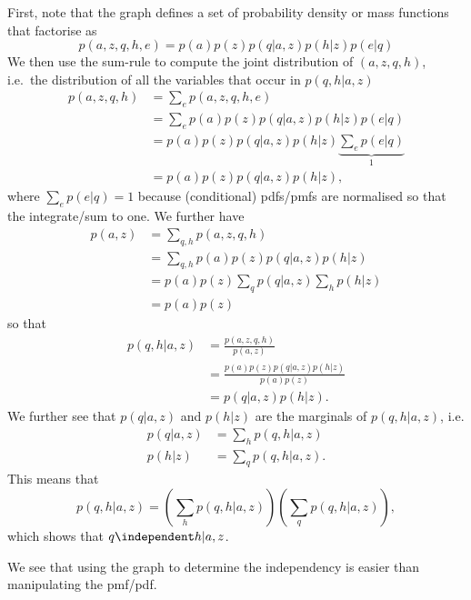 \begin{exenumerate}
\begin{solution}
      First, note that the graph defines a set of probability density
      or mass functions that factorise as
      $$ p(a,z,q,h,e) = p(a) p(z) p(q|a,z) p(h|z) p(e|q)$$ We then use the sum-rule to
      compute the joint distribution of $(a,z,q,h)$, i.e.\ the
      distribution of all the variables that occur in $p(q,h|a,z)$ 
        \begin{align}
          p(a,z,q,h) &= \sum_{e} p(a,z,q,h,e)\\
          &= \sum_{e}  p(a) p(z) p(q|a,z) p(h|z) p(e|q)\\
          & =  p(a) p(z) p(q|a,z) p(h|z) \underbrace{\sum_{e}  p(e|q)}_{1}\\
          & =  p(a) p(z) p(q|a,z) p(h|z),
        \end{align}
        where $\sum_{e}  p(e|q) = 1$ because (conditional) pdfs/pmfs are normalised so that the integrate/sum to one. We further have
        \begin{align}
          p(a,z) & = \sum_{q,h} p(a,z,q,h)\\
          & = \sum_{q,h} p(a) p(z) p(q|a,z) p(h|z)\\
          & = p(a) p(z) \sum_{q}  p(q|a,z) \sum_h p(h|z)\\
          & = p(a) p(z)
        \end{align}
        so that
        \begin{align}
          p(q,h | a,z) & = \frac{ p(a,z,q,h)}{ p(a,z)} \\
          & = \frac{ p(a) p(z) p(q|a,z) p(h|z)}{ p(a) p(z)}\\
          & =  p(q|a,z) p(h|z).
        \end{align}        
        We further see that $p(q| a,z)$ and $p(h|z)$ are the marginals of $p(q,h|a,z)$, i.e.
        \begin{align}
          p(q| a,z) & = \sum_h  p(q,h | a,z)\\
          p(h|z) & = \sum_q  p(q,h | a,z).
        \end{align}
        This means that
        \begin{equation}
           p(q,h | a,z) =\left( \sum_h  p(q,h | a,z) \right) \left(\sum_q  p(q,h | a,z) \right),
        \end{equation}
        which shows that $q \independent h | a,z$.

        We see that using the graph to determine the independency is
        easier than manipulating the pmf/pdf.
        
    \end{solution}
    
\end{exenumerate}

